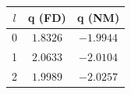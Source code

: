 \begin{tabular}{|c|c|c|}
\hline
$l$ & q (FD) & q (NM) \\
\hline
0 & $1.8326$ & $-1.9944$ \\
\hline
1 & $2.0633$ & $-2.0104$ \\
\hline
2 & $1.9989$ & $-2.0257$ \\
\hline
\end{tabular}
